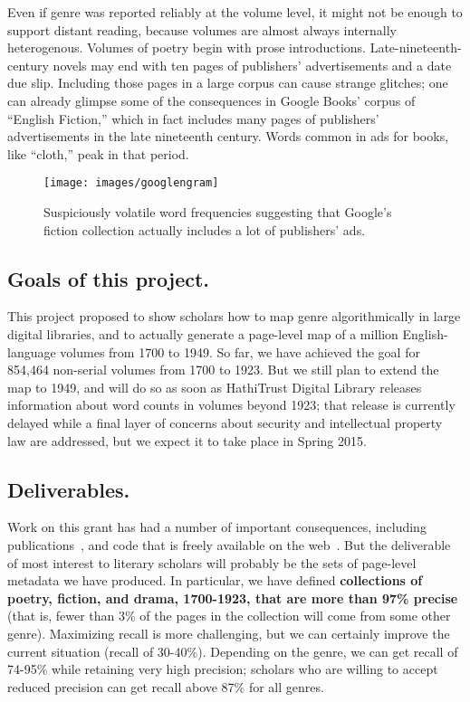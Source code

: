 \documentclass[paper=a4, fontsize=12pt]{scrartcl}
\numberwithin{equation}{section}		%
\numberwithin{figure}{section}			%
\numberwithin{table}{section}				%
\begin{document}
\newpage
Even if genre was reported reliably at the volume level, it might not be enough to support distant reading, because volumes are almost always internally heterogenous. Volumes of poetry  begin with prose introductions. Late-nineteenth-century novels may end with ten pages of publishers' advertisements and a date due slip. Including those pages in a large corpus can cause strange glitches; one can already glimpse some of the consequences in Google Books' corpus of ``English Fiction,'' which in fact includes many pages of publishers' advertisements in the late nineteenth century. Words common in ads for books, like ``cloth,'' peak in that period.

\begin{figure}[!h]
\centering
\texttt{[image: images/googlengram]}
\caption{Suspiciously volatile word frequencies suggesting that Google's fiction collection actually includes a lot of publishers' ads.}
\end{figure}

\newpage
\subsection{Goals of this project.}
This project proposed to show scholars how to map genre algorithmically in large digital libraries, and to actually generate a page-level map of a million English-language volumes from 1700 to 1949. So far, we have achieved the goal for 854,464 non-serial volumes from 1700 to 1923. But we still plan to extend the map to 1949, and will do so as soon as HathiTrust Digital Library releases information about word counts in volumes beyond 1923; that release is currently delayed while a final layer of concerns about security and intellectual property law are addressed, but we expect it to take place in Spring 2015.

\subsection{Deliverables.}
Work on this grant has had a number of important consequences, including publications~\cite{underwood:mutable, underwood:blurry, underwood:slate}, and code that is freely available on the web~\cite{underwood:genrerepo}. But the deliverable of most interest to literary scholars will probably be the sets of page-level metadata we have produced. In particular, we have defined \textbf{collections of poetry, fiction, and drama, 1700-1923, that are more than 97\% precise} (that is, fewer than 3\% of the pages in the collection will come from some other genre). Maximizing recall is more challenging, but we can certainly improve the current situation (recall of 30-40\%). Depending on the genre, we can get recall of 74-95\% while retaining very high precision; scholars who are willing to accept reduced precision can get recall above 87\% for all genres.
\end{document}
